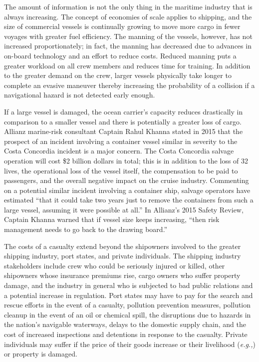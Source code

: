 \documentclass[twoside,symmetric,notoc]{tufte-book}
\newcommand{\hairsp}{\hspace{1pt}}
\newcommand{\eg}{\textit{e.\hairsp{}g.,}\hspace{3pt}}
\begin{document}
\par{%
The amount of information is not the only thing in the maritime industry that is always increasing. The concept of economies of scale applies to shipping, and the size of commercial vessels is continually growing to move more cargo in fewer voyages with greater fuel efficiency.\cite{Henrich} The manning of the vessels, however, has not increased proportionately; in fact, the manning has decreased due to advances in on-board technology and an effort to reduce costs.\cite{Pike} Reduced manning puts a greater workload on all crew members and reduces time for training. In addition to the greater demand on the crew, larger vessels physically take longer to complete an evasive maneuver thereby increasing the probability of a collision if a navigational hazard is not detected early enough.\cite{Zhuo}
}
\par{%
If a large vessel is damaged, the ocean carrier's capacity reduces drastically in comparison to a smaller vessel and there is potentially a greater loss of cargo.\cite{Hemly} Allianz marine-risk consultant Captain Rahul Khanna stated in 2015 that the prospect of an incident involving a container vessel similar in severity to the Costa Concordia incident is a major concern. The Costa Concordia salvage operation will cost \$2 billion dollars in total;\cite{Thompson} this is in addition to the loss of 32 lives, the operational loss of the vessel itself, the compensation to be paid to passengers, and the overall negative impact on the cruise industry.\cite{BBC} Commenting on a potential similar incident involving a container ship, salvage operators have estimated ``that it could take two years just to remove the containers from such a large vessel, assuming it were possible at all.''\cite{Millman} In Allianz's 2015 Safety Review, Captain Khanna warned that if vessel size keeps increasing, ``then risk management needs to go back to the drawing board.''\cite{Allianz_2015} 
}
\par{%
The costs of a casualty extend beyond the shipowners involved to the greater shipping industry, port states, and private individuals. The shipping industry stakeholders include crew who could be seriously injured or killed, other shipowners whose insurance premiums rise, cargo owners who suffer property damage, and the industry in general who is subjected to bad public relations and a potential increase in regulation. Port states may have to pay for the search and rescue efforts in the event of a casualty, pollution prevention measures, pollution cleanup in the event of an oil or chemical spill, the disruptions due to hazards in the nation's navigable waterways, delays to the domestic supply chain, and the cost of increased inspections and detentions in response to the casualty. Private individuals may suffer if the price of their goods increase or their livelihood (\eg{tourism, fishing}) or property is damaged.\cite{SSY}
}
\end{document}
